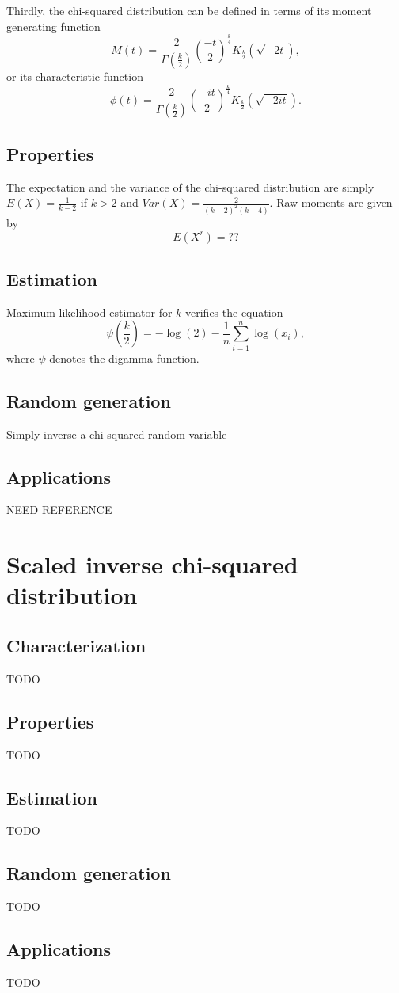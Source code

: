 Thirdly, the chi-squared distribution can be defined in terms of its moment generating function
$$
M(t) = \frac{2}{\Gamma(\frac{k}{2})} \left(\frac{-t}{2}\right)^{\!\!\frac{k}{4}} K_{\frac{k}{2}}\!\left(\sqrt{-2t}\right),
$$
or its characteristic function
$$
\phi(t) =\frac{2}{\Gamma(\frac{k}{2})} \left(\frac{-it}{2}\right)^{\!\!\frac{k}{4}} K_{\frac{k}{2}}\!\left(\sqrt{-2it}\right).
$$ 

\subsection{Properties}
The expectation and the variance of the chi-squared distribution are simply
$E(X) = \frac{1}{k-2} $ if $k>2$ and $Var(X)=\frac{2}{(k-2)^2(k-4)}$. Raw moments are given by
$$
E(X^r) =??
$$


\subsection{Estimation}
Maximum likelihood estimator for $k$ verifies the equation
$$
\psi\left(\frac{k}{2}\right) = -\log(2)-\frac{1}{n}\sum_{i=1}^n \log(x_i),
$$
where $\psi$ denotes the digamma function.

\subsection{Random generation}
Simply inverse a chi-squared random variable

\subsection{Applications}
NEED REFERENCE

\section{Scaled inverse chi-squared distribution}
\subsection{Characterization}
TODO
\subsection{Properties}
TODO
\subsection{Estimation}
TODO
\subsection{Random generation}
TODO
\subsection{Applications}
TODO
